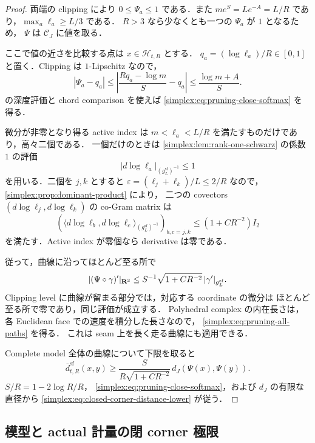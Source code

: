 \begin{proof}
両端の clipping により $0\le\Psi_a\le1$ である．また
$m e^S=L e^{-A}=L/R$ であり，$\max_a\ell_a\ge L/3$ である．
$R>3$ なら少なくとも一つの $\Psi_a$ が $1$ となるため，
$\Psi$ は $\mathcal C_J$ に値を取る．

ここで値の近さを比較する点は $x\in\mathscr H_{t,R}$ とする．
$q_a=(\log\ell_a)/R\in[0,1]$ と置く．Clipping は $1$-Lipschitz なので，
\[
 |\Psi_a-q_a|
 \le\left|\frac{Rq_a-\log m}{S}-q_a\right|
 \le\frac{\log m+A}{S}.
\]
 の深度評価と
chord comparison を使えば \eqref{simplex:eq:pruning-close-softmax} を得る．

微分が非零となり得る active index は
$m<\ell_a<L/R$ を満たすものだけであり，高々二個である．
一個だけのときは \cref{simplex:lem:rank-one-schwarz} の係数 $1$ の評価
\[
 |d\log\ell_a|_{(g_L^{\mathrm{sf}})^{-1}}\le1
\]
を用いる．二個を $j,k$ とすると
$\varepsilon=(\ell_j+\ell_k)/L\le2/R$ なので，
\cref{simplex:prop:dominant-product} により，
二つの covectors $(d\log\ell_j,d\log\ell_k)$ の co-Gram matrix は
\[
 \left(\langle d\log\ell_b,d\log\ell_c
          \rangle_{(g_L^{\mathrm{sf}})^{-1}}\right)_{b,c=j,k}
 \le(1+CR^{-2})I_2
\]
を満たす．Active index が零個なら derivative は零である．

従って，曲線に沿ってほとんど至る所で
\[
 |(\Psi\circ\gamma)'|_{\mathbf R^3}
 \le S^{-1}\sqrt{1+CR^{-2}}\,|\gamma'|_{g_L^{\mathrm{sf}}}.
\]
Clipping level に曲線が留まる部分では，対応する coordinate の微分は
ほとんど至る所で零であり，同じ評価が成立する．
Polyhedral complex の内在長さは，各 Euclidean face での速度を積分した長さなので，
\eqref{simplex:eq:pruning-all-paths} を得る．
これは seam 上を長く走る曲線にも適用できる．

Complete model 全体の曲線について下限を取ると
\[
 \bar d_{t,R}^{\mathrm{sf}}(x,y)
 \ge \frac{S}{R\sqrt{1+CR^{-2}}}\,
                d_J(\Psi(x),\Psi(y)).
\]
$S/R=1-2\log R/R$，
\eqref{simplex:eq:pruning-close-softmax}，および $d_J$ の有限な直径から
\eqref{simplex:eq:closed-corner-distance-lower} が従う．
\end{proof}

\subsection{模型と actual 計量の閉 corner 極限}

